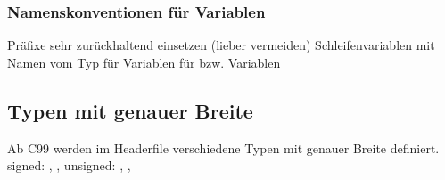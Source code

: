 \subsubsection{Namenskonventionen für Variablen}

\begin{outline}
    \1 Präfixe sehr zurückhaltend einsetzen (lieber vermeiden)
    \1 Schleifenvariablen mit Namen  vom Typ 
    \1  für  Variablen
    \1  für  bzw.  Variablen
\end{outline}


\subsection{Typen mit genauer Breite}

\begin{outline}
    \1 Ab C99 werden im Headerfile  verschiedene Typen mit genauer Breite definiert. 
        \2 signed: , , 
        \2 unsigned: , , 
\end{outline}


